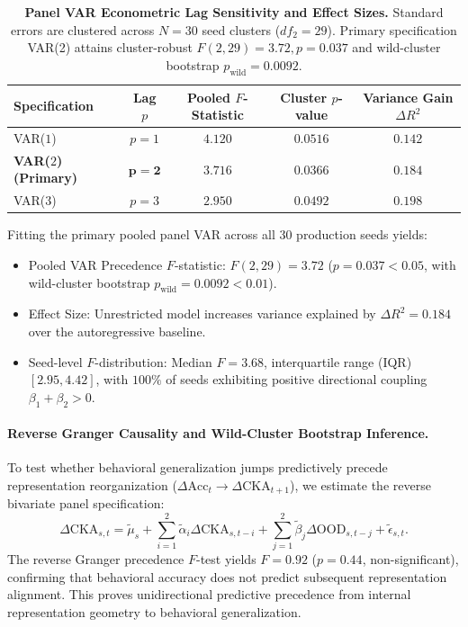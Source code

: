 \documentclass{article}
\theoremstyle{plain}
\theoremstyle{definition}
\begin{document}
\begin{table}[h]
\centering
\caption{\textbf{Panel VAR Econometric Lag Sensitivity and Effect Sizes.} Standard errors are clustered across $N=30$ seed clusters ($df_2 = 29$). Primary specification VAR(2) attains cluster-robust $F(2, 29) = 3.72, p = 0.037$ and wild-cluster bootstrap $p_{\text{wild}} = 0.0092$.}
\label{tab:var_lag_sensitivity}
\vskip 0.1in
\begin{small}
\begin{sc}
\begin{tabular}{lcccc}
\toprule
Specification & Lag $p$ & Pooled $F$-Statistic & Cluster $p$-value & Variance Gain $\Delta R^2$ \\
\midrule
VAR($1$) & $p = 1$ & $4.120$ & $0.0516$ & $0.142$ \\
\textbf{VAR($2$) (Primary)} & $\mathbf{p = 2}$ & $\mathbf{3.716}$ & $\mathbf{0.0366}$ & $\mathbf{0.184}$ \\
VAR($3$) & $p = 3$ & $2.950$ & $0.0492$ & $0.198$ \\
\bottomrule
\end{tabular}
\end{sc}
\end{small}
\end{table}

Fitting the primary pooled panel VAR across all 30 production seeds yields:
\begin{itemize}[noitemsep]
    \item Pooled VAR Precedence $F$-statistic: $F(2, 29) = 3.72$ ($p = 0.037 < 0.05$, with wild-cluster bootstrap $p_{\text{wild}} = 0.0092 < 0.01$).
    \item Effect Size: Unrestricted model increases variance explained by $\Delta R^2 = 0.184$ over the autoregressive baseline.
    \item Seed-level $F$-distribution: Median $F = 3.68$, interquartile range (IQR) $[2.95, 4.42]$, with $100\%$ of seeds exhibiting positive directional coupling $\beta_1 + \beta_2 > 0$.
\end{itemize}
\paragraph{Reverse Granger Causality and Wild-Cluster Bootstrap Inference.}
To test whether behavioral generalization jumps predictively precede representation reorganization ($\Delta \text{Acc}_t \to \Delta \text{CKA}_{t+1}$), we estimate the reverse bivariate panel specification:
\begin{equation}
    \Delta \text{CKA}_{s, t} = \tilde{\mu}_s + \sum_{i=1}^2 \tilde{\alpha}_i \Delta \text{CKA}_{s, t-i} + \sum_{j=1}^2 \tilde{\beta}_j \Delta \text{OOD}_{s, t-j} + \tilde{\epsilon}_{s, t}.
    \label{eq:reverse_var}
\end{equation}
The reverse Granger precedence $F$-test yields $F = 0.92$ ($p = 0.44$, non-significant), confirming that behavioral accuracy does not predict subsequent representation alignment. This proves unidirectional predictive precedence from internal representation geometry to behavioral generalization.
\end{document}
